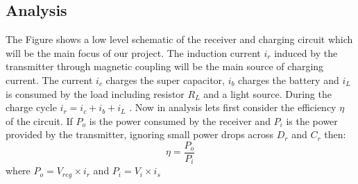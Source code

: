 \subsection{Analysis}
\label{sec:analysis}
The Figure %
shows a low level schematic of the receiver and charging circuit which will be the main focus of our project. The induction current $i_r$ induced by the transmitter through magnetic coupling will be the main source of charging current. The current $i_c$ charges the super capacitor, $i_b$ charges the battery and $i_L$ is consumed by the load including resistor $R_L$ and a light source. During the charge cycle $i_r = i_c + i_b +i_L$ . Now in analysis lets first consider the efficiency ${\eta}$ of the circuit.
If $P_{o}$ is the power consumed by the receiver and $P_{i}$ is the power provided by the transmitter, ignoring small power drops across $D_r$ and $C_r$  then:
\begin{equation}\label{eq:effb}
 {\eta} = \frac{P_o}{P_i}
\end{equation}
where $P_o = V_{reg} \times i_r $ and $P_i = V_i \times i_s $